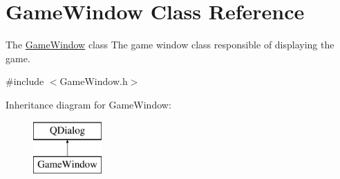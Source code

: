 \hypertarget{class_game_window}{}\section{Game\+Window Class Reference}
\label{class_game_window}


The \hyperlink{class_game_window}{Game\+Window} class The game window class responsible of displaying the game.  




{\ttfamily \#include $<$Game\+Window.\+h$>$}

Inheritance diagram for Game\+Window\+:\begin{figure}[H]
\begin{center}
\leavevmode
\includegraphics[height=2.000000cm]{class_game_window}
\end{center}
\end{figure}
